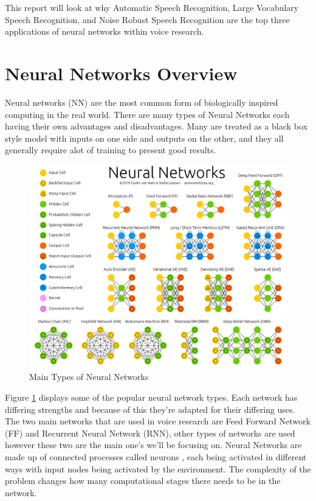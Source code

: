 \documentclass[11pt]{article}
\begin{document}
    This report will look at why Automatic Speech Recognition, Large Vocabulary Speech Recognition, and Noise Robust Speech Recognition are the top three applications of neural networks within voice research.
    
    \section{Neural Networks Overview}
    Neural networks (NN) are the most common form of biologically inspired computing in the real world. There are many types of Neural Networks each having their own advantages and disadvantages. Many are treated as a black box style model with inputs on one side and outputs on the other, and they all generally require alot of training to present good results.
    
    \begin{figure}[h]
        \centering
        \includegraphics[scale=0.1]{NeuralNetwork.png}
        \caption{Main Types of Neural Networks \cite{Leijnen2020TheZoo}}
        \label{fig:neuralNetworks}
    \end{figure}
    
    Figure \ref{fig:neuralNetworks} displays some of the popular neural network types. Each network has differing strengths and because of this they're adapted for their differing uses. The two main networks that are used in voice research are Feed Forward Network (FF) and Recurrent Neural Network (RNN), other types of networks are used however these two are the main one's we'll be focusing on. Neural Networks are made up of connected processes called neurons \cite{Schmidhuber2015DeepOverview}, each being activated in different ways with input nodes being activated by the environment. The complexity of the problem changes how many computational stages there needs to be in the network.
    
\end{document}
